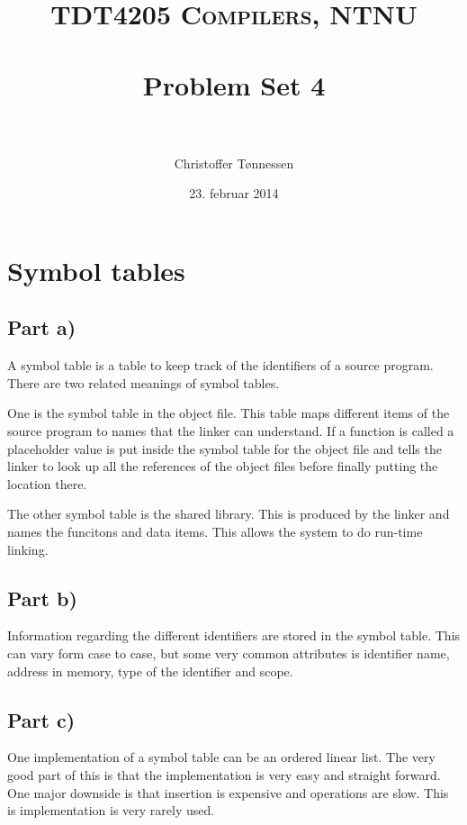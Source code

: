 \documentclass[paper=a4, fontsize=11pt]{scrartcl} %
\title{ 
\normalfont \normalsize 
\textsc{TDT4205 Compilers, NTNU} \\ [25pt] %
\horrule{0.5pt} \\[0.4cm] %
\huge Problem Set 4 \\ %
\horrule{2pt} \\[0.5cm] %
}
\author{Christoffer Tønnessen} %
\date{\normalsize23. februar 2014} %
\numberwithin{equation}{section} %
\numberwithin{figure}{section} %
\numberwithin{table}{section} %
\begin{document}
\maketitle %


\section{Symbol tables}

\subsection{Part a)}
A symbol table is a table to keep track of the identifiers of a source program.
There are two related meanings of symbol tables.

One is the symbol table in the object file. This table maps different items of the source program to names that the linker can understand.
If a function is called a placeholder value is put inside the symbol table for the object file and tells the linker to look up all the references of the object files before finally putting the location there.

The other symbol table is the shared library. This is produced by the linker and names the funcitons and data items. This allows the system to do run-time linking.
\subsection{Part b)}
Information regarding the different identifiers are stored in the symbol table.
This can vary form case to case, but some very common attributes is identifier name, address in memory, type of the identifier and scope.
\subsection{Part c)}
One implementation of a symbol table can be an ordered linear list.
The very good part of this is that the implementation is very easy and straight forward.
One major downside is that insertion is expensive and operations are slow.
This is implementation is very rarely used.
\end{document}
